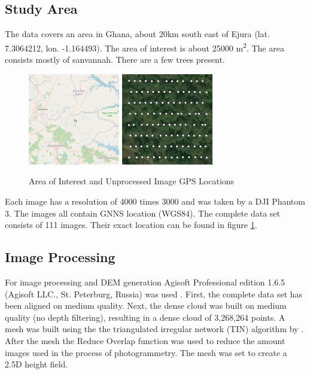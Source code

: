 \documentclass{isprs} %
\begin{document}
\subsection{Study Area}\label{sec:Study Area}
The data covers an area in Ghana, about 20km south east of Ejura (lat. 7.3064212, lon. -1.164493). 
The area of interest is about 25000 m\textsuperscript{2}. 
The area consists mostly of sanvannah.
There are a few trees present.
\begin{figure}[htp]
    \centering
    \includegraphics[width=4cm]{locationwide.png}
    \includegraphics[width=4cm]{imgloc.png}
    \caption{Area of Interest and Unprocessed Image GPS Locations}
    \label{fig:areaofinterest}
\end{figure}
Each image has a resolution of 4000 times 3000 and was taken by a DJI Phantom 3.
The images all contain GNNS location (WGS84). 
The complete data set consists of 111 images.
Their exact location can be found in figure \ref{fig:areaofinterest}.


\subsection{Image Processing}
For image processing and DEM generation Agisoft Professional edition 1.6.5 (Agisoft LLC., St. Peterburg, Russia) was used \citep{AgisoftMetashape}.
First, the complete data set has been aligned on medium quality.
Next, the dense cloud was built on medium quality (no depth filtering), resulting in a dense cloud of 3,268,264 points.
A mesh was built using the the triangulated irregular network (TIN) algorithm by \citet{axelsson1999processing}. 
After the mesh the Reduce Overlap function was used to reduce the amount images used in the process of photogrammetry. 
The mesh was set to create a 2.5D height field.
\end{document}
